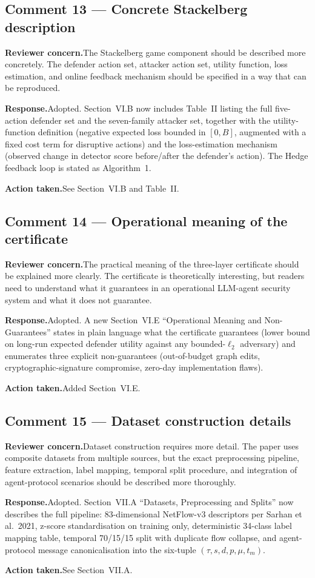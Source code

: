 \documentclass[11pt,a4paper]{article}
\newcommand{\concern}[1]{\noindent\textbf{Reviewer concern.}\quad #1\par\vspace{0.3em}}
\newcommand{\response}[1]{\noindent\textbf{Response.}\quad #1\par\vspace{0.3em}}
\newcommand{\action}[1]{\noindent\textbf{Action taken.}\quad #1\par\vspace{0.8em}}
\begin{document}
\subsection*{Comment 13 --- Concrete Stackelberg description}
\concern{The Stackelberg game component should be described more concretely. The defender action set, attacker action set, utility function, loss estimation, and online feedback mechanism should be specified in a way that can be reproduced.}
\response{Adopted. Section~VI.B now includes Table~II listing the full five-action defender set and the seven-family attacker set, together with the utility-function definition (negative expected loss bounded in $[0,B]$, augmented with a fixed cost term for disruptive actions) and the loss-estimation mechanism (observed change in detector score before/after the defender's action). The Hedge feedback loop is stated as Algorithm~1.}
\action{See Section~VI.B and Table~II.}

\subsection*{Comment 14 --- Operational meaning of the certificate}
\concern{The practical meaning of the three-layer certificate should be explained more clearly. The certificate is theoretically interesting, but readers need to understand what it guarantees in an operational LLM-agent security system and what it does not guarantee.}
\response{Adopted. A new Section~VI.E ``Operational Meaning and Non-Guarantees'' states in plain language what the certificate guarantees (lower bound on long-run expected defender utility against any bounded-$\ell_{2}$ adversary) and enumerates three explicit non-guarantees (out-of-budget graph edits, cryptographic-signature compromise, zero-day implementation flaws).}
\action{Added Section~VI.E.}

\subsection*{Comment 15 --- Dataset construction details}
\concern{Dataset construction requires more detail. The paper uses composite datasets from multiple sources, but the exact preprocessing pipeline, feature extraction, label mapping, temporal split procedure, and integration of agent-protocol scenarios should be described more thoroughly.}
\response{Adopted. Section~VII.A ``Datasets, Preprocessing and Splits'' now describes the full pipeline: 83-dimensional NetFlow-v3 descriptors per Sarhan et al.\ 2021, z-score standardisation on training only, deterministic 34-class label mapping table, temporal 70/15/15 split with duplicate flow collapse, and agent-protocol message canonicalisation into the six-tuple $(\tau,s,d,p,\mu,t_{m})$.}
\action{See Section~VII.A.}
\end{document}
